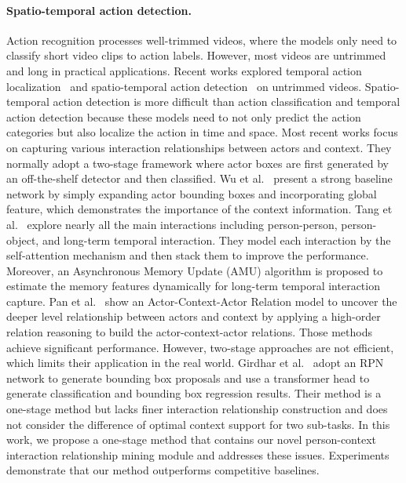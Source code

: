 \documentclass[final]{cvpr}
\begin{document}
\paragraph{Spatio-temporal action detection.}
Action recognition processes well-trimmed videos, where the models only need to classify short video clips to action labels. However, most videos are untrimmed and long in practical applications. Recent works explored temporal action localization~\cite{shou2016temporal,zhao2017temporal,chao2018rethinking,lin2019bmn,bai2020boundary,zhao2020bottom,DBLP:journals/corr/abs-2103-16024} and spatio-temporal action detection~\cite{Girdhar_2019_CVPR,DBLP:conf/cvpr/GuSRVPLVTRSSM18,DBLP:conf/eccv/SunSVMSS18,DBLP:conf/cvpr/YangY0XDK19,kopuklu2019yowo,Wu_2019_CVPR,DBLP:conf/eccv/WuKWZW20,DBLP:conf/eccv/TangXMPL20,DBLP:conf/cvpr/PanCSLS021} on untrimmed videos. Spatio-temporal action detection is more difficult than action classification and temporal action detection because these models need to not only predict the action categories but also localize the action in time and space. Most recent works focus on capturing various interaction relationships between actors and context. They normally adopt a two-stage framework where actor boxes are first generated by an off-the-shelf detector and then classified. Wu et al.~\cite{DBLP:conf/eccv/WuKWZW20} present a strong baseline network by simply expanding actor bounding boxes and incorporating global feature, which demonstrates the importance of the context information. Tang et al.~\cite{DBLP:conf/eccv/TangXMPL20} explore nearly all the main interactions including person-person, person-object, and long-term temporal interaction. They model each interaction by the self-attention mechanism and then stack them to improve the performance. Moreover, an Asynchronous Memory Update (AMU) algorithm is proposed to estimate the memory features dynamically for long-term temporal interaction capture. Pan et al.~\cite{DBLP:conf/cvpr/PanCSLS021} show an Actor-Context-Actor Relation model to uncover the deeper level relationship between actors and context by applying a high-order relation reasoning to build the actor-context-actor relations. Those methods achieve significant performance. However, two-stage approaches are not efficient, which limits their application in the real world. Girdhar et al.~\cite{Girdhar_2019_CVPR} adopt an RPN network to generate bounding box proposals and use a transformer head to generate classification and bounding box regression results. Their method is a one-stage method but lacks finer interaction relationship construction and does not consider the difference of optimal context support for two sub-tasks. In this work, we propose a one-stage method that contains our novel person-context interaction relationship mining module and addresses these issues. Experiments demonstrate that our method outperforms competitive baselines.
\end{document}
